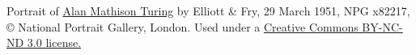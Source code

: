 Portrait of
\href{http://www.npg.org.uk/collections/search/portrait/mw63680/Alan-Mathison-Turing?}{Alan
Mathison Turing} by Elliott \& Fry, 29 March 1951, NPG
x82217, \copyright{} National Portrait Gallery, London. Used under
a \href{http://creativecommons.org/licenses/by-nc-nd/3.0/}{Creative
Commons BY-NC-ND 3.0 license.}
